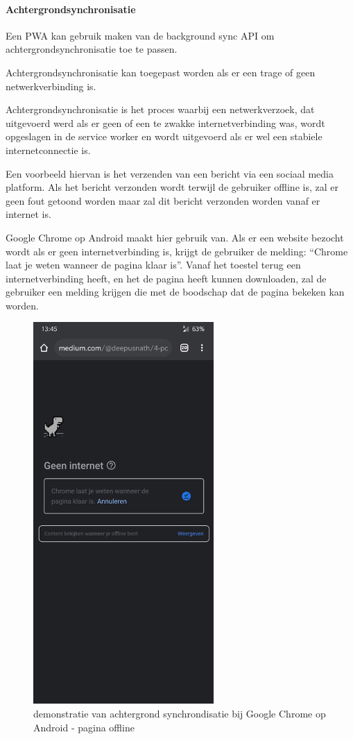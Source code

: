 	\paragraph{Achtergrondsynchronisatie }
		Een PWA kan gebruik maken van de background sync API om achtergrondsynchronisatie toe te passen.
		
		Achtergrondsynchronisatie kan toegepast worden als er een trage of geen netwerkverbinding is. 
		
		Achtergrondsynchronisatie is het proces waarbij een netwerkverzoek, dat uitgevoerd werd als er geen of een te zwakke internetverbinding was, wordt opgeslagen in de service worker en wordt uitgevoerd als er wel een stabiele internetconnectie is.
		
		Een voorbeeld hiervan is het verzenden van een bericht via een sociaal media platform. Als het bericht verzonden wordt terwijl de gebruiker offline is, zal er geen fout getoond worden maar zal dit bericht verzonden worden vanaf er internet is.
		
		Google Chrome op Android maakt hier gebruik van. Als er een website bezocht wordt als er geen internetverbinding is, krijgt de gebruiker de melding: “Chrome laat je weten wanneer de pagina klaar is”. Vanaf het toestel terug een internetverbinding heeft, en het de pagina heeft kunnen downloaden,  zal de gebruiker een melding krijgen die met de boodschap dat de pagina bekeken kan worden.
	
	
		\begin{figure}[!htb]
			\centering
			\includegraphics{./img/backSync1.png}{}
			\caption{demonstratie van achtergrond synchrondisatie bij Google Chrome op Android - pagina offline}
		\end{figure}
		

